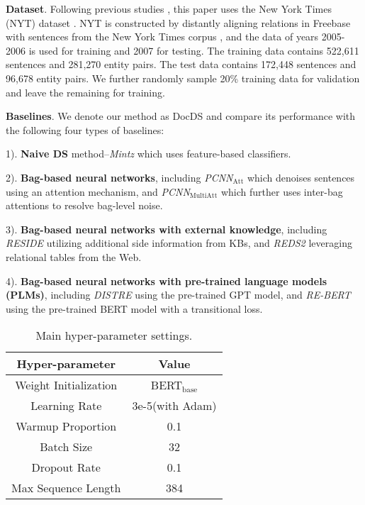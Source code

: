 \documentclass[11pt,a4paper]{article}
\begin{document}
  \textbf{Dataset}.
  Following previous studies \cite{riedel_modeling_2010,lin_neural_2016}, this paper uses the New York Times (NYT) dataset \cite{riedel_modeling_2010}. NYT is constructed by distantly aligning relations in Freebase with sentences from the New York Times corpus \cite{bollacker_freebase_2008}, and the data of years 2005-2006 is used for training and 2007 for testing.
  The training data contains 522,611 sentences and 281,270 entity pairs.
  The test data contains 172,448 sentences and 96,678 entity pairs.
  We further randomly sample 20\% training data for validation and leave the remaining for training.
  
  \textbf{Baselines}.
  We denote our method as DocDS and compare its performance with the following four types of baselines:
  
  1). \textbf{Naive DS} method--\emph{Mintz}\cite{mintz_distant_2009} which uses feature-based classifiers.
  
  2). \textbf{Bag-based neural networks}, including \emph{PCNN$_\text{Att}$}\cite{lin_neural_2016} which denoises sentences using an attention mechanism, and \emph{PCNN$_\text{MultiAtt}$}\cite{ye_distant_2019} which further uses inter-bag attentions to resolve bag-level noise.
  
  3). \textbf{Bag-based neural networks with external knowledge}, including \emph{RESIDE}\cite{vashishth_reside_2018} utilizing additional side information from KBs, and \emph{REDS2} \cite{deng_leveraging_2019} leveraging relational tables from the Web.
  
  4). \textbf{Bag-based neural networks with pre-trained language models (PLMs)}, including \emph{DISTRE} \cite{alt_finetuning_2019} using the pre-trained GPT model, and \emph{RE-BERT}\cite{wu_practical_2020} using the pre-trained BERT model with a transitional loss.
  
  \begin{table}[!t]
    \setlength{\belowcaptionskip}{-1em}
    \centering
      \begin{tabular}{cc}
      \toprule
      \textbf{Hyper-parameter} & \textbf{Value} \\
      \midrule
      Weight Initialization & BERT$_\text{base}$ \\
      Learning Rate & 3e-5(with Adam) \\
      Warmup Proportion  & 0.1 \\
      Batch Size & 32 \\
      Dropout Rate & 0.1 \\
      Max Sequence Length & 384 \\
      \bottomrule
      \end{tabular}\caption{Main hyper-parameter settings.}
    \label{tab:parameter}\end{table}
\end{document}
